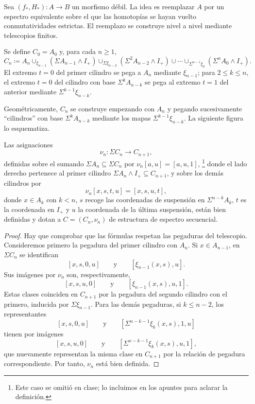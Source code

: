 Sea $(f_*,H_*)\colon A\to B$ un morfismo débil. La idea es reemplazar $A$ por un espectro equivalente sobre el que las homotopías se hayan vuelto conmutatividades estrictas. El reemplazo se construye nivel a nivel mediante telescopios finitos.

\begin{defi}\label{defi:telescopio}
Se define $C_0=A_0$ y, para cada $n\ge1$,
\[
C_n\coloneqq A_n
\cup_{\xi_{n-1}}(\Sigma A_{n-1}\wedge I_+)
\cup_{\Sigma\xi_{n-2}}(\Sigma^2A_{n-2}\wedge I_+)
\cup\cdots
\cup_{\Sigma^{n-1}\xi_0}(\Sigma^nA_0\wedge I_+).
\]
El extremo $t=0$ del primer cilindro se pega a $A_n$ mediante $\xi_{n-1}$; para $2\le k\le n$, el extremo $t=0$ del cilindro con base $\Sigma^kA_{n-k}$ se pega al extremo $t=1$ del anterior mediante $\Sigma^{k-1}\xi_{n-k}$.
\end{defi}

Geométricamente, $C_{n}$ se construye empezando con $A_{n}$ y pegando sucesivamente \enquote{cilindros} con base $\Sigma^k A_{n-k}$ mediante los mapas $\Sigma^{k-1}\xi_{n-k}$. La siguiente figura lo esquematiza.

\begin{center}

\end{center}

\begin{prop}\label{prop:nu-bien-definido}
Las asignaciones
\[
\nu_n\colon\Sigma C_n\longrightarrow C_{n+1},
\]
definidas sobre el sumando $\Sigma A_n\subseteq\Sigma C_n$ por
$\nu_n[a,u]=[a,u,1]$,%
\footnote{
    Este caso se omitió en clase; lo incluimos en los apuntes para aclarar la definición.
}
donde el lado derecho pertenece al primer cilindro $\Sigma A_n\wedge I_+\subseteq C_{n+1}$, y sobre los demás cilindros por
\[
\nu_n[x,s,t,u]=[x,s,u,t],
\]
donde $x\in A_k$ con $k<n$, $s$ recoge las coordenadas de suspensión en $\Sigma^{n-k}A_k$, $t$ es la coordenada en $I_+$ y $u$ la coordenada de la última suspensión, están bien definidas y dotan a $C=(C_n,\nu_n)$ de estructura de espectro secuencial.
\end{prop}
\begin{proof}
Hay que comprobar que las fórmulas respetan las pegaduras del telescopio. Consideremos primero la pegadura del primer cilindro con $A_n$. Si $x\in A_{n-1}$, en $\Sigma C_n$ se identifican
\[
[x,s,0,u]
\qquad\text{y}\qquad
[\xi_{n-1}(x,s),u].
\]
Sus imágenes por $\nu_n$ son, respectivamente,
\[
[x,s,u,0]
\qquad\text{y}\qquad
[\xi_{n-1}(x,s),u,1].
\]
Estas clases coinciden en $C_{n+1}$ por la pegadura del segundo cilindro con el primero, inducida por $\Sigma\xi_{n-1}$.
Para las demás pegaduras, si $k\le n-2$, los representantes
\[
[x,s,0,u]
\qquad\text{y}\qquad
[\Sigma^{n-k-1}\xi_k(x,s),1,u]
\]
tienen por imágenes
\[
[x,s,u,0]
\qquad\text{y}\qquad
[\Sigma^{n-k-1}\xi_k(x,s),u,1],
\]
que nuevamente representan la misma clase en $C_{n+1}$ por la relación de pegadura correspondiente. Por tanto, $\nu_n$ está bien definida. \qedhere
\end{proof}

